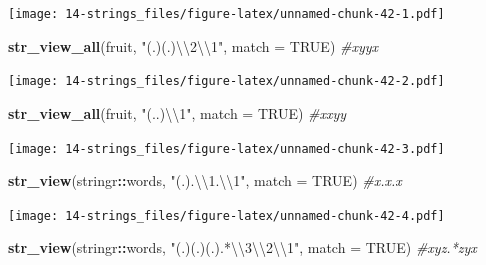 \documentclass[]{book}
\newenvironment{Shaded}{\begin{snugshade}}{\end{snugshade}}
\newcommand{\CharTok}[1]{\textcolor[rgb]{0.31,0.60,0.02}{#1}}
\newcommand{\CommentTok}[1]{\textcolor[rgb]{0.56,0.35,0.01}{\textit{#1}}}
\newcommand{\DataTypeTok}[1]{\textcolor[rgb]{0.13,0.29,0.53}{#1}}
\newcommand{\KeywordTok}[1]{\textcolor[rgb]{0.13,0.29,0.53}{\textbf{#1}}}
\newcommand{\NormalTok}[1]{#1}
\newcommand{\OperatorTok}[1]{\textcolor[rgb]{0.81,0.36,0.00}{\textbf{#1}}}
\newcommand{\OtherTok}[1]{\textcolor[rgb]{0.56,0.35,0.01}{#1}}
\newcommand{\StringTok}[1]{\textcolor[rgb]{0.31,0.60,0.02}{#1}}
\theoremstyle{definition}
\theoremstyle{definition}
\theoremstyle{definition}
\theoremstyle{remark}
\begin{document}
\begin{enumerate}
  \texttt{[image: 14-strings\_files/figure-latex/unnamed-chunk-42-1.pdf]}

\begin{Shaded}
\begin{Highlighting}[]
\KeywordTok{str_view_all}\NormalTok{(fruit, }\StringTok{"(.)(.)}\CharTok{\textbackslash{}\textbackslash{}}\StringTok{2}\CharTok{\textbackslash{}\textbackslash{}}\StringTok{1"}\NormalTok{, }\DataTypeTok{match =} \OtherTok{TRUE}\NormalTok{) }\CommentTok{#xyyx}
\end{Highlighting}
\end{Shaded}

  \texttt{[image: 14-strings\_files/figure-latex/unnamed-chunk-42-2.pdf]}

\begin{Shaded}
\begin{Highlighting}[]
\KeywordTok{str_view_all}\NormalTok{(fruit, }\StringTok{"(..)}\CharTok{\textbackslash{}\textbackslash{}}\StringTok{1"}\NormalTok{, }\DataTypeTok{match =} \OtherTok{TRUE}\NormalTok{) }\CommentTok{#xxyy}
\end{Highlighting}
\end{Shaded}

  \texttt{[image: 14-strings\_files/figure-latex/unnamed-chunk-42-3.pdf]}

\begin{Shaded}
\begin{Highlighting}[]
\KeywordTok{str_view}\NormalTok{(stringr}\OperatorTok{::}\NormalTok{words, }\StringTok{"(.).}\CharTok{\textbackslash{}\textbackslash{}}\StringTok{1.}\CharTok{\textbackslash{}\textbackslash{}}\StringTok{1"}\NormalTok{, }\DataTypeTok{match =} \OtherTok{TRUE}\NormalTok{) }\CommentTok{#x.x.x}
\end{Highlighting}
\end{Shaded}

  \texttt{[image: 14-strings\_files/figure-latex/unnamed-chunk-42-4.pdf]}

\begin{Shaded}
\begin{Highlighting}[]
\KeywordTok{str_view}\NormalTok{(stringr}\OperatorTok{::}\NormalTok{words, }\StringTok{"(.)(.)(.).*}\CharTok{\textbackslash{}\textbackslash{}}\StringTok{3}\CharTok{\textbackslash{}\textbackslash{}}\StringTok{2}\CharTok{\textbackslash{}\textbackslash{}}\StringTok{1"}\NormalTok{, }\DataTypeTok{match =} \OtherTok{TRUE}\NormalTok{) }\CommentTok{#xyz.*zyx}
\end{Highlighting}
\end{Shaded}


\end{enumerate}
\end{document}
